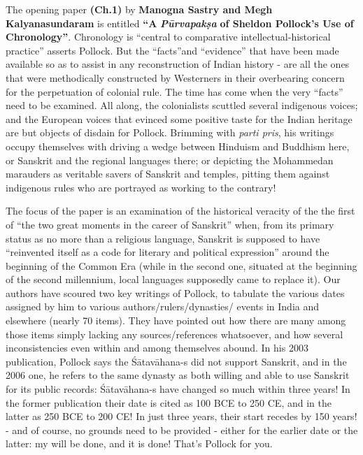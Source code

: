 The opening paper \textbf{(Ch.1)} by \textbf{Manogna Sastry and Megh Kalyanasundaram} is entitled \textbf{“A} \textit{\textbf{Pūrvapakṣa}}\textbf{ of Sheldon Pollock's Use of Chronology”}. Chronology is “central to comparative intellectual-historical practice” asserts Pollock. But the “facts”and “evidence” that have been made available so as to assist in any reconstruction of Indian history - are all the ones that were methodically constructed by Westerners in their overbearing concern for the perpetuation of colonial rule. The time has come when the very “facts” need to be examined. All along, the colonialists scuttled several indigenous voices; and the European voices that evinced some positive taste for the Indian heritage are but objects of disdain for Pollock. Brimming with\textit{ parti pris}, his writings occupy themselves with driving a wedge between Hinduism and Buddhism here, or Sanskrit and the regional languages there; or depicting the Mohammedan marauders as veritable savers of Sanskrit and temples, pitting them against indigenous rules who are portrayed as working to the contrary!

The focus of the paper is an examination of the historical veracity of the the first of “the two great moments in the career of Sanskrit” when, from its primary status as no more than a religious language, Sanskrit is supposed to have “reinvented itself as a code for literary and political expression” around the beginning of the Common Era (while in the second one, situated at the beginning of the second millennium, local languages supposedly came to replace it). Our authors have scoured two key writings of Pollock, to tabulate the various dates assigned by him to various authors/rulers/dynasties/ events in India and elsewhere (nearly 70 items). They have pointed out how there are many among those items simply lacking any sources/references whatsoever, and how several inconsistencies even within and among themselves abound. In his 2003 publication, Pollock says the Śātavāhana-s did not support Sanskrit, and in the 2006 one, he refers to the same dynasty as both willing and able to use Sanskrit for its public records: Śātavāhana-s have changed so much within three years! In the former publication their date is cited as 100 BCE to 250 CE, and in the latter as 250 BCE to 200 CE! In just three years, their start recedes by 150 years! - and of course, no grounds need to be provided - either for the earlier date or the latter: my will be done, and it is done! That’s Pollock for you.


